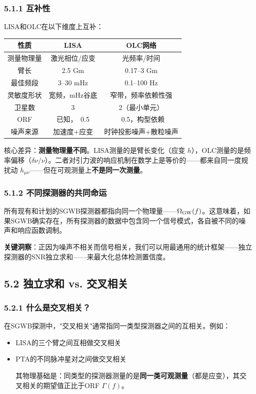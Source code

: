 \documentclass[12pt,a4paper]{article}
\begin{document}
\subsubsection{5.1.1 互补性}


LISA和OLC在以下维度上互补：

\begin{tabular}{|c|c|c|}
\hline
性质 & LISA & OLC网络 \\
\hline
测量物理量 & 激光相位/应变 & 光频率/时间 \\
臂长 & 2.5 Gm & 0.17–3 Gm \\
最佳频段 & 3–30 mHz & 0.1–100 Hz \\
灵敏度形状 & 宽频，mHz谷底 & 窄带，频率依赖性强 \\
卫星数 & 3 & 2（最小单元） \\
ORF & 已知，~0.5 & ~0.5，构型依赖 \\
噪声来源 & 加速度+应变 & 时钟投影噪声+散粒噪声 \\
\hline
\end{tabular}


核心差异：\textbf{测量物理量不同}。LISA测量的是臂长变化（应变 $h$），OLC测量的是频率偏移（$\delta\nu/\nu$）。二者对引力波的响应机制在数学上是等价的——都来自同一度规扰动 $h_{\mu\nu}$——但在可观测量上\textbf{不是同一次测量}。

\subsubsection{5.1.2 不同探测器的共同命运}


所有现有和计划的SGWB探测器都指向同一个物理量——$\Omega_{\rm GW}(f)$。这意味着，如果SGWB确实存在，所有探测器的数据中包含同一个信号模式，各自被不同的噪声和响应函数调制。

\textbf{关键洞察}：正因为噪声不相关而信号相关，我们可以用最通用的统计框架——独立探测器的SNR独立求和——来最大化总体检测置信度。

\subsection{5.2 独立求和 vs. 交叉相关}


\subsubsection{5.2.1 什么是交叉相关？}


在SGWB探测中，"交叉相关"通常指同一类型探测器之间的互相关。例如：
\begin{itemize}
  \item LISA的三个臂之间互相做交叉相关
  \item PTA的不同脉冲星对之间做交叉相关

其物理基础是：同类型的探测器测量的是\textbf{同一类可观测量}（都是应变），其交叉相关的期望值正比于ORF $\Gamma(f)$。

\end{itemize}
\end{document}
